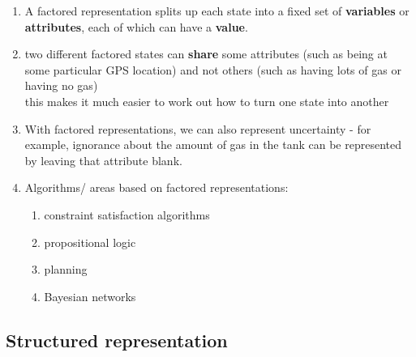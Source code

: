 \begin{enumerate}[itemsep=0.2cm]
    \item A factored representation splits up each state into a fixed set of \textbf{variables} or \textbf{attributes}, each of which can have a \textbf{value}.
    \hfill \cite{ai/book/Artificial-Intelligence-A-Modern-Approach/Russell-Norvig}

    \item two different factored states can \textbf{share} some attributes (such as being at some particular GPS location) and not others (such as having lots of gas or having no gas)
    \\
    this makes it much easier to work out how to turn one state into another
    \hfill \cite{ai/book/Artificial-Intelligence-A-Modern-Approach/Russell-Norvig}

    \item With factored representations, we can also represent uncertainty - for example, ignorance about the amount of gas in the tank can be represented by leaving that attribute blank.
    \hfill \cite{ai/book/Artificial-Intelligence-A-Modern-Approach/Russell-Norvig}

    \item Algorithms/ areas based on factored representations:
    \begin{enumerate}
        \item constraint satisfaction algorithms
        \hfill \cite{ai/book/Artificial-Intelligence-A-Modern-Approach/Russell-Norvig}

        \item propositional logic
        \hfill \cite{ai/book/Artificial-Intelligence-A-Modern-Approach/Russell-Norvig}

        \item planning
        \hfill \cite{ai/book/Artificial-Intelligence-A-Modern-Approach/Russell-Norvig}

        \item Bayesian networks
        \hfill \cite{ai/book/Artificial-Intelligence-A-Modern-Approach/Russell-Norvig}

    \end{enumerate}
\end{enumerate}








\subsection{Structured representation}


